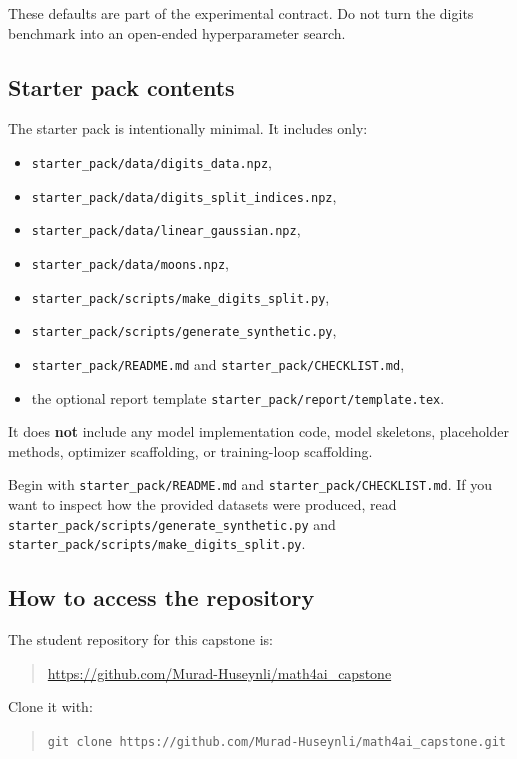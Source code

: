 \documentclass[11pt]{article}
\newcommand{\filepath}[1]{\nolinkurl{#1}}
\begin{document}
These defaults are part of the experimental contract. Do not turn the digits benchmark into an open-ended hyperparameter search.

\subsection{Starter pack contents}

The starter pack is intentionally minimal. It includes only:

\begin{itemize}
    \item \filepath{starter_pack/data/digits_data.npz},
    \item \filepath{starter_pack/data/digits_split_indices.npz},
    \item \filepath{starter_pack/data/linear_gaussian.npz},
    \item \filepath{starter_pack/data/moons.npz},
    \item \filepath{starter_pack/scripts/make_digits_split.py},
    \item \filepath{starter_pack/scripts/generate_synthetic.py},
    \item \filepath{starter_pack/README.md} and \filepath{starter_pack/CHECKLIST.md},
    \item the optional report template \filepath{starter_pack/report/template.tex}.
\end{itemize}

It does \textbf{not} include any model implementation code, model skeletons, placeholder methods, optimizer scaffolding, or training-loop scaffolding.

Begin with \filepath{starter_pack/README.md} and \filepath{starter_pack/CHECKLIST.md}. If you want to inspect how the provided datasets were produced, read \filepath{starter_pack/scripts/generate_synthetic.py} and \filepath{starter_pack/scripts/make_digits_split.py}.

\subsection{How to access the repository}

The student repository for this capstone is:
\begin{quote}
\url{https://github.com/Murad-Huseynli/math4ai_capstone}
\end{quote}

Clone it with:
\begin{quote}
\verb|git clone https://github.com/Murad-Huseynli/math4ai_capstone.git|
\end{quote}
\end{document}

